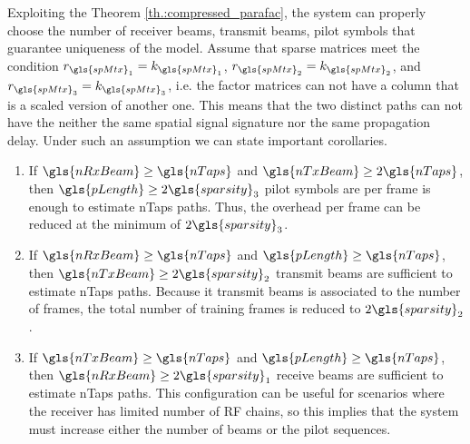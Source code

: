 \documentclass[conference]{IEEEtran}
\begin{document}
Exploiting the Theorem \ref{th.:compressed_parafac}, the system can properly
choose the number of receiver beams, transmit beams, pilot symbols that
guarantee uniqueness of the model. Assume that sparse matrices meet the condition $r_{\gls{spMtx}_1}=k_{\gls{spMtx}_1}$,
$r_{\gls{spMtx}_2}=k_{\gls{spMtx}_2}$, and
$r_{\gls{spMtx}_3}=k_{\gls{spMtx}_3}$, i.e. the factor matrices can not have a
column that is a scaled version of another one. This means that the two
distinct paths can not have the neither the
same spatial signal signature nor the same propagation delay.  Under such an
assumption we can state important corollaries.
\begin{enumerate}
\item If $\gls{nRxBeam}\geq\gls{nTaps}$ and   $\gls{nTxBeam}\geq 2\gls{nTaps}$, then
  $\gls{pLength} \geq 2\gls{sparsity}_3$ pilot symbols are per frame is enough to estimate
  \gls{nTaps} paths. Thus, the overhead per frame can be reduced at the minimum
  of $2\gls{sparsity}_3$.
\item If $\gls{nRxBeam} \geq \gls{nTaps}$ and   $\gls{pLength} \geq \gls{nTaps}$, then
  $\gls{nTxBeam} \geq 2\gls{sparsity}_2$ transmit beams are sufficient to estimate
  \gls{nTaps} paths. Because it transmit beams is associated to the number of
  frames, the total number of training frames is reduced to $2\gls{sparsity}_2$.
\item If $\gls{nTxBeam} \geq \gls{nTaps}$ and   $\gls{pLength} \geq \gls{nTaps}$, then
  $\gls{nRxBeam} \geq 2\gls{sparsity}_1$ receive beams are sufficient to estimate
  \gls{nTaps} paths. This configuration can be useful for scenarios where the
  receiver has limited number of \gls{RF} chains, so this implies that the
  system must increase either the number of beams or the pilot sequences.
\end{enumerate}
\end{document}
